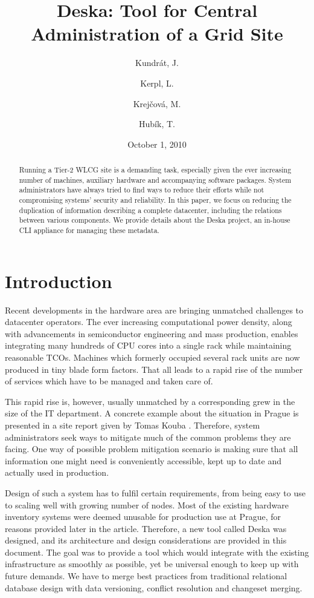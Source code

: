 \documentclass[11pt]{article}
\title{\sc Deska: Tool for Central Administration of a Grid Site}
\author[1,2,*]{Kundrát, J.}
\affil[1]{Institute of Physics of the AS CR, Prague, Czech Republic}
\author[2]{Kerpl, L.}
\author[2]{Krejčová, M.}
\author[2]{Hubík, T.}
\affil[2]{Faculty of Mathematics and Physics, Charles University in Prague, Czech Republic}
\date{October 1, 2010}
\begin{document}
\let\oldthefootnote\thefootnote
\renewcommand{\thefootnote}{\fnsymbol{footnote}}
\let\thefootnote\oldthefootnote

\maketitle
 
\begin{abstract}
Running a Tier-2 WLCG site is a demanding task, especially given the ever
increasing number of machines, auxiliary hardware and accompanying software
packages.  System administrators have always tried to find ways to reduce their
efforts while not compromising systems' security and reliability.  In this
paper, we focus on reducing the duplication of information describing a complete
datacenter, including the relations between various components.  We provide
details about the Deska project, an in-house CLI appliance for managing these
metadata.
\end{abstract}


\section{Introduction}

Recent developments in the hardware area are bringing unmatched challenges to
datacenter operators.  The ever increasing computational power density, along
with advancements in semiconductor engineering and mass production, enables
integrating many hundreds of CPU cores into a single rack while maintaining
reasonable TCOs.  Machines which formerly occupied several rack units are now
produced in tiny blade form factors.  That all leads to a rapid rise of the
number of services which have to be managed and taken care of.

This rapid rise is, however, usually unmatched by a corresponding grew in the
size of the IT department.  A concrete example about the situation in Prague is
presented in a site report given by Tomas Kouba \cite{kouba}. Therefore, system
administrators seek ways to mitigate much of the common problems they are
facing.  One way of possible problem mitigation
scenario is making sure that all information one might need is conveniently
accessible, kept up to date and actually used in production.

Design of such a system has to fulfil certain requirements, from being easy to
use to scaling well with growing number of nodes.  Most of the existing hardware
inventory systems were deemed unusable for production use at Prague, for reasons
provided later in the article.  Therefore, a new tool called Deska was
designed, and its architecture and design considerations are provided in this
document.  The goal was to provide a tool which would integrate with the existing
infrastructure as smoothly as possible, yet be universal enough to keep up with
future demands.  We have to merge best practices from traditional relational
database design with data versioning, conflict resolution and changeset merging.
\end{document}
